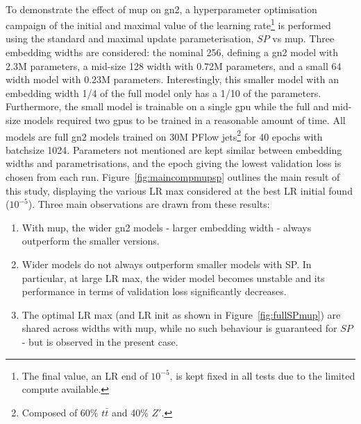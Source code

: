 \paragraph{}To demonstrate the effect of \gls{mup} on \gls{gn2}, a hyperparameter optimisation campaign of the initial and maximal value of the learning rate\footnote{The final value, an LR end of $10^{-5}$, is kept fixed in all tests due to the limited compute available.} is performed using the standard and maximal update parameterisation, $SP$ vs \gls{mup}. Three embedding widths are considered: the nominal 256, defining a \gls{gn2} model with 2.3M parameters, a mid-size 128 width with 0.72M parameters, and a small 64 width model with 0.23M parameters. Interestingly, this smaller model with an embedding width 1/4 of the full model only has a 1/10 of the parameters. Furthermore, the small model is trainable on a single \gls{gpu} while the full and mid-size models required two \glspl{gpu} to be trained in a reasonable amount of time. All models are full \gls{gn2} models trained on 30M PFlow jets\footnote{Composed of 60\% $t\bar{t}$ and 40\% $Z'$.} for 40 epochs with batchsize 1024. Parameters not mentioned are kept similar between embedding widths and parametrisations, and the epoch giving the lowest validation loss is chosen from each run. Figure~\ref{fig:maincompmupsp} outlines the main result of this study, displaying the various LR max considered at the best LR initial found ($10^{-5}$). Three main observations are drawn from these results:
\begin{enumerate}
  \item With \gls{mup}, the wider \gls{gn2} models - larger embedding width - always outperform the smaller versions. 
  \item Wider models do not always outperform smaller models with SP. In particular, at large LR max, the wider model becomes unstable and its performance in terms of validation loss significantly decreases.
  \item The optimal LR max (and LR init as shown in Figure~\ref{fig:fullSPmup}) are shared across widths with \gls{mup}, while no such behaviour is guaranteed for $SP$ - but is observed in the present case.
\end{enumerate}

